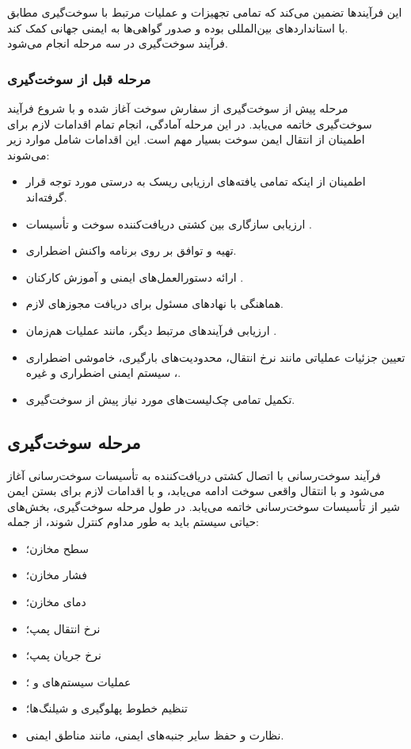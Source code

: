 این فرآیندها تضمین می‌کند که تمامی تجهیزات و عملیات مرتبط با سوخت‌گیری  مطابق با استانداردهای بین‌المللی بوده و صدور گواهی‌ها به ایمنی جهانی کمک کند.
\\
فرآیند سوخت‌گیری در سه مرحله انجام می‌شود.
\subsubsection{مرحله قبل از سوخت‌گیری }
مرحله پیش از سوخت‌گیری 
	 از سفارش سوخت آغاز شده و با شروع فرآیند سوخت‌گیری خاتمه می‌یابد.  
در این مرحله آمادگی، انجام تمام اقدامات لازم برای اطمینان از انتقال ایمن سوخت بسیار مهم است. این اقدامات شامل موارد زیر می‌شوند:

\begin{itemize}
	\item اطمینان از اینکه تمامی یافته‌های ارزیابی ریسک به درستی مورد توجه قرار گرفته‌اند.
	\item ارزیابی سازگاری بین کشتی دریافت‌کننده سوخت و تأسیسات .
	\item تهیه و توافق بر روی برنامه واکنش اضطراری.
	\item ارائه دستورالعمل‌های ایمنی و آموزش کارکنان .
	\item هماهنگی با نهادهای مسئول برای دریافت مجوزهای لازم.
	\item ارزیابی فرآیندهای مرتبط دیگر، مانند عملیات هم‌زمان .
	\item تعیین جزئیات عملیاتی مانند نرخ انتقال، محدودیت‌های بارگیری،  
	خاموشی اضطراری
	، سیستم ایمنی اضطراری
	و غیره.
	\item تکمیل تمامی چک‌لیست‌های مورد نیاز پیش از سوخت‌گیری.
\end{itemize}

\subsection{مرحله سوخت‌گیری}

فرآیند سوخت‌رسانی
 با اتصال کشتی دریافت‌کننده به تأسیسات سوخت‌رسانی آغاز می‌شود و با انتقال واقعی سوخت ادامه می‌یابد، و با اقدامات لازم برای بستن ایمن شیر از تأسیسات سوخت‌رسانی خاتمه می‌یابد.  
در طول مرحله سوخت‌گیری، بخش‌های حیاتی سیستم باید به طور مداوم کنترل شوند، از جمله:

\begin{itemize}
	\item سطح مخازن؛
	\item فشار مخازن؛
	\item دمای مخازن؛
	\item نرخ انتقال پمپ؛
	\item نرخ جریان پمپ؛
	\item عملیات سیستم‌های  و ؛
	\item تنظیم خطوط پهلوگیری و شیلنگ‌ها؛
	\item نظارت و حفظ سایر جنبه‌های ایمنی، مانند مناطق ایمنی.
\end{itemize}

